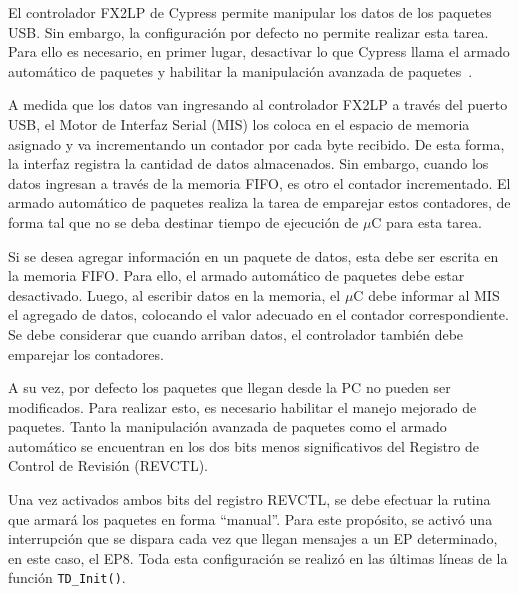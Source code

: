 	El controlador FX2LP de Cypress permite manipular los datos de los paquetes USB. Sin embargo, la configuración por defecto no permite realizar esta tarea. Para ello es necesario, en primer lugar, desactivar lo que Cypress llama el armado automático de paquetes y habilitar la manipulación avanzada de paquetes~\cite{CypressSemiconductor2014fx2lp}.
	
	A medida que los datos van ingresando al controlador FX2LP a través del puerto USB, el Motor de Interfaz Serial (MIS) los coloca en el espacio de memoria asignado y va incrementando un contador por cada byte recibido. De esta forma, la interfaz registra la cantidad de datos almacenados. Sin embargo, cuando los datos ingresan a través de la memoria FIFO, es otro el contador incrementado. El armado automático de paquetes realiza la tarea de emparejar estos contadores, de forma tal que no se deba destinar tiempo de ejecución de $\mu$C para esta tarea. 
	
	Si se desea agregar información en un paquete de datos, esta debe ser escrita en la memoria FIFO. Para ello, el armado automático de paquetes debe estar desactivado. Luego, al escribir datos en la memoria, el $\mu$C debe informar al MIS el agregado de datos, colocando el valor adecuado en el contador correspondiente. Se debe considerar que cuando arriban datos, el controlador también debe emparejar los contadores.
	
	A su vez, por defecto los paquetes que llegan desde la PC no pueden ser modificados. Para realizar esto, es necesario habilitar el manejo mejorado de paquetes. Tanto la manipulación avanzada de paquetes como el armado automático se encuentran en los dos bits menos significativos del Registro de Control de Revisión (REVCTL).
	
	Una vez activados ambos bits del registro REVCTL, se debe efectuar la rutina que armará los paquetes en forma ``manual''. Para este propósito, se activó una interrupción que se dispara cada vez que llegan mensajes a un EP determinado, en este caso, el EP8. Toda esta configuración se realizó en las últimas líneas de la función \verb|TD_Init()|.
	
%	
